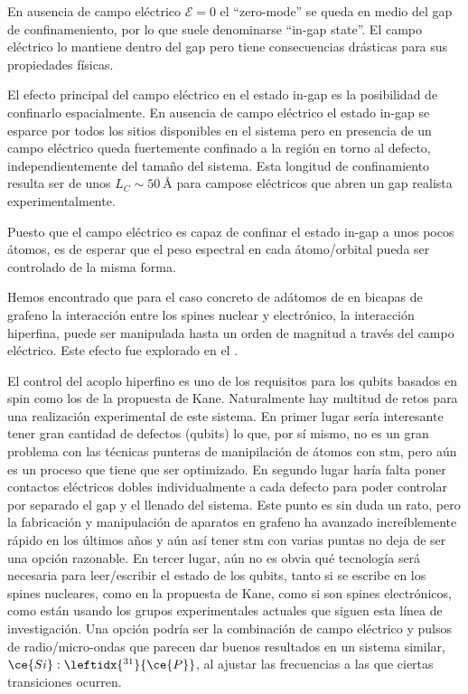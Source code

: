 En ausencia de campo eléctrico $\mathcal{E}=0$ el ``zero-mode'' se queda en medio del gap de confinameniento, por lo que suele denominarse ``in-gap state''. El campo eléctrico lo mantiene dentro del gap pero tiene consecuencias drásticas para sus propiedades físicas.

El efecto principal del campo eléctrico en el estado in-gap es la posibilidad de confinarlo espacialmente. En ausencia de campo eléctrico el estado in-gap se esparce por todos los sitios disponibles en el sistema pero en presencia de un campo eléctrico queda fuertemente confinado a la región en torno al defecto, independientemente del tamaño del sistema.
Esta longitud de confinamiento resulta ser de unos $L_C\sim\SI{50}{\angstrom}$ para campose eléctricos que abren un gap realista experimentalmente.

Puesto que el campo eléctrico es capaz de confinar el estado in-gap a unos pocos átomos, es de esperar que el peso espectral en cada átomo/orbital pueda ser controlado de la misma forma.

Hemos encontrado que para el caso concreto de adátomos de  en bicapas de grafeno la interacción entre los spines nuclear y electrónico, la interacción hiperfina, puede ser manipulada hasta un orden de magnitud a través del campo eléctrico. Este efecto fue explorado en el .

El control del acoplo hiperfino es uno de los requisitos para los qubits basados en spin como los de la propuesta de Kane. Naturalmente hay multitud de retos para una realización experimental de este sistema. En primer lugar sería interesante tener gran cantidad de defectos (qubits) lo que, por sí mismo, no es un gran problema con las técnicas punteras de manipilación de átomos con \ac{stm}, pero aún es un proceso que tiene que ser optimizado.
En segundo lugar haría falta poner contactos eléctricos dobles individualmente a cada defecto para poder controlar por separado el gap y el llenado del sistema. Este punto es sin duda un rato, pero la fabricación y manipulación de aparatos en grafeno ha avanzado increíblemente rápido en los últimos años y aún así tener \ac{stm} con varias puntas no deja de ser una opción razonable.
En tercer lugar, aún no es obvia qué tecnología será necesaria para leer/escribir el estado de los qubits, tanto si se escribe en los spines nucleares, como en la propuesta de Kane, como si son spines electrónicos, como están usando los grupos experimentales actuales que siguen esta línea de investigación. Una opción podría ser la combinación de campo eléctrico y pulsos de radio/micro-ondas que parecen dar buenos resultados en un sistema similar, $\ce{Si}:\leftidx{^{31}}{\ce{P}}$, al ajustar las frecuencias a las que ciertas transiciones ocurren.


